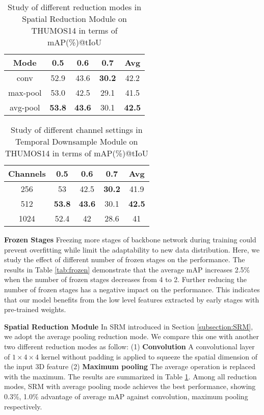 \documentclass[final]{cvpr}
\begin{document}
\begin{table}[htbp]
    \caption{Study of different reduction modes in Spatial Reduction Module on THUMOS14 in terms of mAP(\%)@tIoU}
    \centering
    \begin{tabular}{ c | c c c c }
        \toprule
        Mode & 0.5 & 0.6 & 0.7 & Avg \\
        \midrule
        conv & 52.9 & 43.6 & \textbf{30.2} & 42.2 \\
        max-pool & 53.0 & 42.5 & 29.1 & 41.5\\
        avg-pool & \textbf{53.8} & \textbf{43.6} & 30.1 & \textbf{42.5} \\
        \bottomrule
    \end{tabular}
    \label{tab:SRM}
\end{table}

\begin{table}[htbp]
    \caption{Study of different channel settings in Temporal Downsample Module on THUMOS14 in terms of mAP(\%)@tIoU}
    \centering
    \begin{tabular}{ c | c c c c }
        \toprule
        Channels & 0.5 & 0.6 & 0.7 & Avg \\
        \midrule
        256 & 53 & 42.5 & \textbf{30.2} & 41.9 \\
        512 & \textbf{53.8} & \textbf{43.6} & 30.1 & \textbf{42.5} \\
        1024 & 52.4 & 42 & 28.6 & 41 \\
        \bottomrule
    \end{tabular}
    \label{tab:channel}
\end{table}

\textbf{Frozen Stages}
Freezing more stages of backbone network during training could prevent overfitting while limit the adaptability to new data distribution. Here, we study the effect of different number of frozen stages on the performance. The results in Table \ref{tab:frozen} demonstrate that the average mAP increases 2.5\% when the number of frozen stages decreases from 4 to 2. Further reducing the number of frozen stages has a negative impact on the performance. This indicates that our model benefits from the low level features extracted by early stages with pre-trained weights.

\textbf{Spatial Reduction Module}
In SRM introduced in Section \ref{subsection:SRM}, we adopt the average pooling reduction mode. We compare this one with another two different reduction modes as follow: (1) \textbf{Convolution} A convolutional layer of $1\times4\times4$ kernel without padding is applied to squeeze the spatial dimension of the input 3D feature (2) \textbf{Maximum pooling} The average operation is replaced with the maximum. The results are summarized in Table \ref{tab:SRM}. Among all reduction modes, SRM with average pooling mode achieves the best performance, showing 0.3\%, 1.0\% advantage of average mAP against convolution, maximum pooling respectively.
\end{document}

